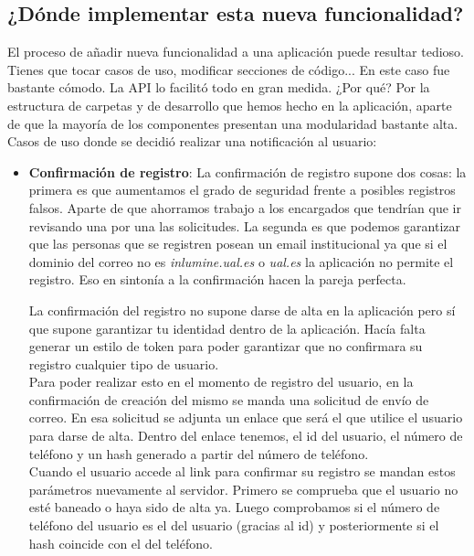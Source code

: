 \subsection{¿Dónde implementar esta nueva funcionalidad?}
El proceso de añadir nueva funcionalidad a una aplicación puede resultar tedioso. Tienes que tocar casos de uso, modificar secciones de código... En este caso fue bastante cómodo. La API lo facilitó todo en gran medida. ¿Por qué? Por la estructura de carpetas y de desarrollo que hemos hecho en la aplicación, aparte de que la mayoría de los componentes presentan una modularidad bastante alta.
\\Casos de uso donde se decidió realizar una notificación al usuario:
\begin{itemize}
    \item \textbf{Confirmación de registro}: La confirmación de registro supone dos cosas: la primera es que aumentamos el grado de seguridad frente a posibles registros falsos. Aparte de que ahorramos trabajo a los encargados que tendrían que ir revisando una por una las solicitudes. La segunda es que podemos garantizar que las personas que se registren posean un email institucional ya que si el dominio del correo no es \textit{inlumine.ual.es} o \textit{ual.es} la aplicación no permite el registro. Eso en sintonía a la confirmación hacen la pareja perfecta.
          \begin{tcolorbox}
              [colback=green!5!white,colframe=green!75!black,fonttitle=\bfseries,title=¿Cómo podemos realizar la confirmación del registro?]
              La confirmación del registro no supone darse de alta en la aplicación pero sí que supone garantizar tu identidad dentro de la aplicación. Hacía falta generar un estilo de token para poder garantizar que no confirmara su registro cualquier tipo de usuario.
              \\Para poder realizar esto en el momento de registro del usuario, en la confirmación de creación del mismo se manda una solicitud de envío de correo. En esa solicitud se adjunta un enlace que será el que utilice el usuario para darse de alta. Dentro del enlace tenemos, el id del usuario, el número de teléfono y un hash generado a partir del número de teléfono.
              \\Cuando el usuario accede al link para confirmar su registro se mandan estos parámetros nuevamente al servidor. Primero se comprueba que el usuario no esté baneado o haya sido de alta ya. Luego comprobamos si el número de teléfono del usuario es el del usuario (gracias al id) y posteriormente si el hash coincide con el del teléfono.

\end{tcolorbox}
\end{itemize}
